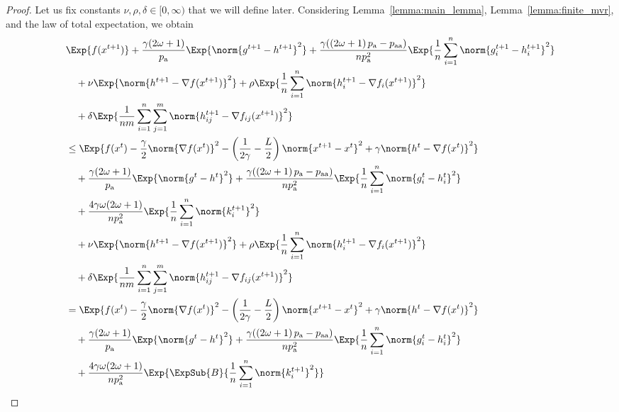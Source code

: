\documentclass{article}
\newcommand*{\probavailable}{\ensuremath{p_{\textnormal{a}}}}
\newcommand*{\probpairaa}{\ensuremath{p_{\textnormal{aa}}}}
\begin{document}
\begin{proof}
  Let us fix constants $\nu, \rho, \delta \in [0,\infty)$ that we will define later. Considering Lemma~\ref{lemma:main_lemma}, Lemma~\ref{lemma:finite_mvr}, and the law of total expectation, we obtain
    \begin{align*}
      &\Exp{f(x^{t + 1})} + \frac{\gamma (2 \omega + 1)}{\probavailable} \Exp{\norm{g^{t+1} - h^{t+1}}^2} + \frac{\gamma (\left(2 \omega + 1\right)\probavailable - \probpairaa)}{n \probavailable^2} \Exp{\frac{1}{n}\sum_{i=1}^n\norm{g^{t+1}_i - h^{t+1}_i}^2}\\
      &\quad  + \nu \Exp{\norm{h^{t+1} - \nabla f(x^{t+1})}^2} + \rho \Exp{\frac{1}{n}\sum_{i=1}^n\norm{h^{t+1}_i - \nabla f_i(x^{t+1})}^2}\\
      &\quad + \delta \Exp{\frac{1}{nm}\sum_{i=1}^n\sum_{j=1}^m\norm{h^{t+1}_{ij} - \nabla f_{ij}(x^{t+1})}^2} \\
      &\leq \Exp{f(x^t) - \frac{\gamma}{2}\norm{\nabla f(x^t)}^2 - \left(\frac{1}{2\gamma} - \frac{L}{2}\right)
      \norm{x^{t+1} - x^t}^2 + \gamma \norm{h^{t} - \nabla f(x^t)}^2}\nonumber\\
      &\quad + \frac{\gamma (2 \omega + 1)}{\probavailable}\Exp{\norm{g^{t} - h^t}^2}+ \frac{\gamma (\left(2 \omega + 1\right)\probavailable - \probpairaa)}{n \probavailable^2}\Exp{\frac{1}{n} \sum_{i=1}^n\norm{g^t_i - h^{t}_i}^2} \\
      &\quad + \frac{4 \gamma \omega (2 \omega + 1)}{n \probavailable^2} \Exp{\frac{1}{n} \sum_{i=1}^n\norm{k^{t+1}_i}^2} \\
      &\quad  + \nu \Exp{\norm{h^{t+1} - \nabla f(x^{t+1})}^2} + \rho \Exp{\frac{1}{n}\sum_{i=1}^n\norm{h^{t+1}_i - \nabla f_i(x^{t+1})}^2}\\
      &\quad + \delta \Exp{\frac{1}{nm}\sum_{i=1}^n\sum_{j=1}^m\norm{h^{t+1}_{ij} - \nabla f_{ij}(x^{t+1})}^2} \\
      &= \Exp{f(x^t) - \frac{\gamma}{2}\norm{\nabla f(x^t)}^2 - \left(\frac{1}{2\gamma} - \frac{L}{2}\right)
      \norm{x^{t+1} - x^t}^2 + \gamma \norm{h^{t} - \nabla f(x^t)}^2}\nonumber\\
      &\quad + \frac{\gamma (2 \omega + 1)}{\probavailable}\Exp{\norm{g^{t} - h^t}^2}+ \frac{\gamma (\left(2 \omega + 1\right)\probavailable - \probpairaa)}{n \probavailable^2}\Exp{\frac{1}{n} \sum_{i=1}^n\norm{g^t_i - h^{t}_i}^2} \\
      &\quad + \frac{4 \gamma \omega (2 \omega + 1)}{n \probavailable^2} \Exp{\ExpSub{B}{\frac{1}{n} \sum_{i=1}^n\norm{k^{t+1}_i}^2}} \\

\end{align*}
\end{proof}
\end{document}
